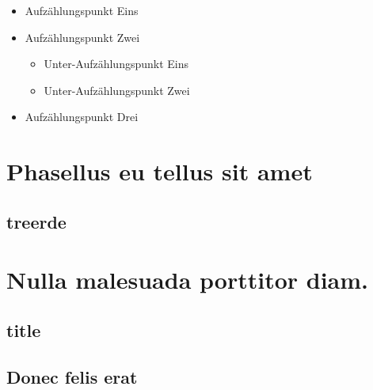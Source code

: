 \documentclass[%
  a4paper,%
  12pt,%
  blue,%
  ]{tubsartcl}
\begin{document}
\begin{itemize}
  \item Aufzählungspunkt Eins
  \item Aufzählungspunkt Zwei
    \begin{itemize}
      \item Unter-Aufzählungspunkt Eins
      \item Unter-Aufzählungspunkt Zwei
    \end{itemize}
  \item Aufzählungspunkt Drei
\end{itemize}

\section{Phasellus eu tellus sit amet}
\subsection{treerde}
\lipsum[2-5]

\section{Nulla malesuada porttitor diam.}
\subsection{title}

\subsection{Donec felis erat}

\lipsum[4-7]
\end{document}
